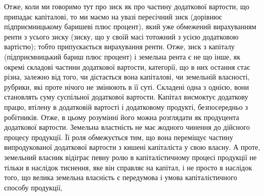 Отже, коли ми говоримо тут про зиск як про частину додаткової вартости,
що припадає капіталові, то ми маємо на увазі пересічний зиск (дорівнює підприємницькому
баришеві плюс процент), який уже обмежений вирахуванням
ренти з усього зиску (зиску, що у своїй масі тотожний з усією додатковою
вартістю); тобто припускається вирахування ренти. Отже, зиск з капіталу (підприємницький
бариш плюс процент) і земельна рента є не що інше, як окремі
складові частини додаткової вартости, категорії, що в них остання стає різна,
залежно від того, чи дістається вона капіталові, чи земельній власності, рубрики,
які проте нічого не змінюють в її суті. Складені одна з однією, вони становлять
суму суспільної додаткової вартости. Капітал висмоктує додаткову працю, втілену
в додатковій вартості і додатковому продукті, безпосередньо з робітників. Отже,
в цьому розумінні його можна розглядати як продуцента додаткової вартости.
Земельна властність не має жодного чинення до дійсного процесу продукції.
Її роля обмежується тим, що вона переміщує частину випродукованої додаткової
вартости з кишені капіталіста у свою власну. А проте, земельний власник відіграє
певну ролю в капіталістичному процесі продукції не тільки в наслідок
тиснення, яке він справляє на капітал, і не просто в наслідок того, що велика
земельна власність є передумова і умова капіталістичного способу продукції,
\parbreak{}  %
